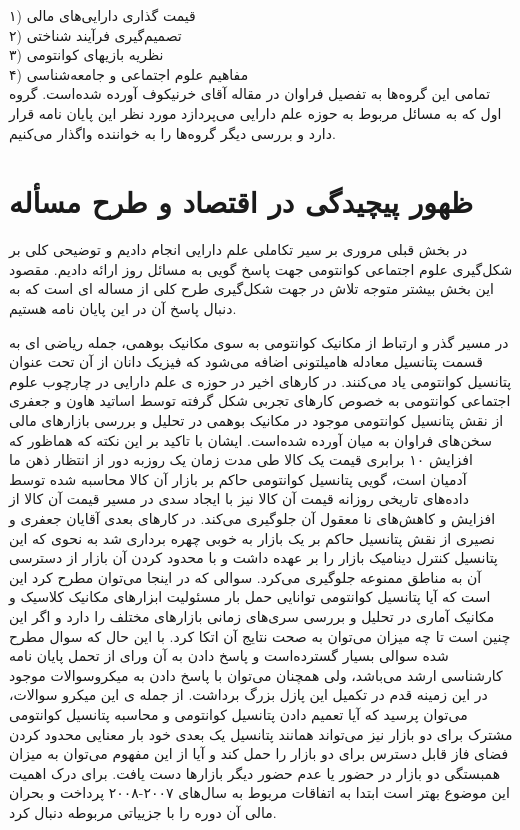 \documentclass[a4paper,titlepage,12pt,fleqn,oneside]{report}
\begin{document}
۱) قیمت گذاری دارایی‌های مالی\\
۲) تصمیم‌گیری فرآیند شناختی\\
۳) نظریه بازیهای کوانتومی\\
۴) مفاهیم علوم اجتماعی و جامعه‌شناسی\\
تمامی این گروه‌ها به تفصیل فراوان در مقاله آقای خرنیکوف\cite{kh1} آورده شده‌است. گروه اول که به مسائل مربوط به حوزه علم دارایی می‌پردازد مورد نظر این پایان نامه قرار دارد و بررسی دیگر گروه‌ها را به خواننده واگذار می‌کنیم.


    \section{ظهور پیچیدگی در اقتصاد و طرح مسأله}
در بخش قبلی مروری بر سیر تکاملی علم دارایی انجام دادیم و توضیحی کلی بر شکل‌گیری علوم اجتماعی کوانتومی جهت پاسخ گویی به مسائل روز ارائه دادیم. مقصود این بخش بیشتر متوجه تلاش در جهت شکل‌گیری طرح کلی از مساله ای است که به دنبال پاسخ آن در این پایان نامه هستیم. 

در مسیر گذر و ارتباط از مکانیک کوانتومی به سوی مکانیک بوهمی، جمله ریاضی ای به قسمت پتانسیل معادله هامیلتونی اضافه می‌شود که فیزیک دانان از آن تحت عنوان پتانسیل کوانتومی یاد می‌کنند. 
در کارهای اخیر در حوزه ی علم دارایی در چارچوب علوم اجتماعی کوانتومی به خصوص کارهای تجربی شکل گرفته توسط اساتید هاون\cite{haven1} و 
 جعفری\cite{tahmaseb} از نقش پتانسیل کوانتومی موجود در مکانیک بوهمی در تحلیل و بررسی بازارهای مالی سخن‌های فراوان به میان آورده شده‌است. ایشان با تاکید بر این نکته که هماظور که افزایش ۱۰ برابری قیمت یک کالا طی مدت زمان یک روزبه دور از انتظار ذهن ما آدمیان است، گویی پتانسیل کوانتومی حاکم بر بازار آن کالا محاسبه شده توسط داده‌های تاریخی روزانه قیمت آن کالا نیز با ایجاد سدی در مسیر قیمت آن کالا از افزایش و کاهش‌های نا معقول آن جلوگیری می‌کند. در کارهای بعدی آقایان جعفری و نصیری از نقش پتانسیل حاکم بر یک بازار به خوبی چهره برداری شد به نحوی که این پتانسیل کنترل دینامیک بازار را بر عهده داشت و با محدود کردن آن بازار از دسترسی آن به مناطق ممنوعه جلوگیری می‌کرد\cite{nas1}\cite{nas2}. سوالی که در اینجا می‌توان مطرح کرد این است که آیا پتانسیل کوانتومی توانایی حمل بار مسئولیت ابزارهای مکانیک کلاسیک و مکانیک آماری در تحلیل و بررسی سری‌های زمانی بازارهای مختلف را دارد و اگر این چنین است تا چه میزان می‌توان به صحت نتایج آن اتکا کرد. با این حال که سوال مطرح شده سوالی بسیار گسترده‌است و پاسخ دادن به آن ورای از تحمل پایان نامه کارشناسی ارشد می‌باشد، ولی همچنان می‌توان با پاسخ دادن به میکروسوالات موجود در این زمینه قدم در تکمیل این پازل بزرگ برداشت. از جمله ی این میکرو سوالات، می‌توان پرسید که آیا تعمیم دادن پتانسیل کوانتومی و محاسبه پتانسیل کوانتومی مشترک برای دو بازار نیز می‌تواند همانند پتانسیل یک بعدی خود بار معنایی محدود کردن فضای فاز قابل دسترس برای دو بازار را حمل کند و آیا از این مفهوم می‌توان به میزان همبستگی دو بازار در حضور یا عدم حضور دیگر بازار‌ها دست یافت. برای درک اهمیت این موضوع بهتر است ابتدا به اتفاقات مربوط به سال‌های ۲۰۰۷-۲۰۰۸ پرداخت و بحران مالی آن دوره را با جزییاتی مربوطه دنبال کرد.\newline
\end{document}
